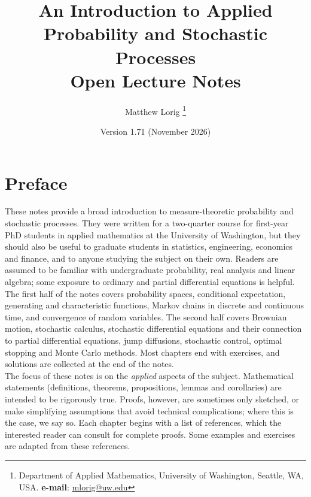 \documentclass[12pt]{book}
\numberwithin{equation}{chapter}
\theoremstyle{plain}
\numberwithin{theorem}{section}
\theoremstyle{definition}
\numberwithin{exercise}{chapter}
\newcommand{\<}{\langle}
\renewcommand{\>}{\rangle}
\renewcommand{\(}{\left(}
\renewcommand{\)}{\right)}
\renewcommand{\[}{\left[}
\renewcommand{\]}{\right]}
\begin{document}
\frontmatter
\title{An Introduction to Applied Probability and Stochastic Processes\\[0.5em] \large Open Lecture Notes}
\author{Matthew Lorig \thanks{Department of Applied Mathematics, University of Washington, Seattle, WA, USA.  \textbf{e-mail}: \url{mlorig@uw.edu}}}
\date{Version 1.71 (November 2026)}
\maketitle
\tableofcontents
\chapter{Preface} 
These notes provide a broad introduction to measure-theoretic probability and stochastic processes.
They were written for a two-quarter course for first-year PhD students in applied mathematics at the University of Washington, but they should also be useful to graduate students in statistics, engineering, economics and finance, and to anyone studying the subject on their own.
Readers are assumed to be familiar with undergraduate probability, real analysis and linear algebra; some exposure to ordinary and partial differential equations is helpful.
\\[0.5em]
The first half of the notes covers probability spaces, conditional expectation, generating and characteristic functions, Markov chains in discrete and continuous time, and convergence of random variables.
The second half covers Brownian motion, stochastic calculus, stochastic differential equations and their connection to partial differential equations, jump diffusions, stochastic control, optimal stopping and Monte Carlo methods.
Most chapters end with exercises, and solutions are collected at the end of the notes.
\\[0.5em]
The focus of these notes is on the \emph{applied} aspects of the subject.
Mathematical statements (definitions, theorems, propositions, lemmas and corollaries) are intended to be rigorously true.
Proofs, however, are sometimes only sketched, or make simplifying assumptions that avoid technical complications; where this is the case, we say so.
Each chapter begins with a list of references, which the interested reader can consult for complete proofs.
Some examples and exercises are adapted from these references.
\end{document}
